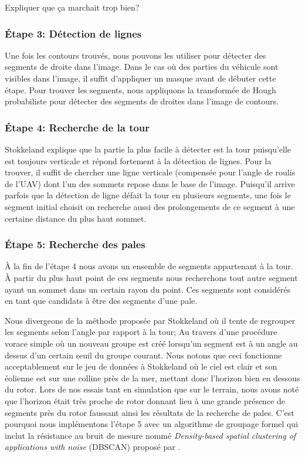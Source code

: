 \incomplete  Expliquer que ça marchait trop bien?

\subsubsection{Étape 3: Détection de lignes}

Une fois les contours trouvés, nous pouvons les utiliser pour détecter des segments de droite dans l'image. Dans le cas où des parties du véhicule sont visibles dans l'image, il suffit d'appliquer un masque avant de débuter cette étape. Pour trouver les segments, nous appliquons la transformée de Hough probabiliste pour détecter des segments de droites dans l'image de contours.

\subsubsection{Étape 4: Recherche de la tour}
\label{subsubsec:approach4}

Stokkeland explique que la partie la plus facile à détecter est la tour puisqu'elle est toujours verticale et répond fortement à la détection de lignes. Pour la trouver, il suffit de chercher une ligne verticale (compensée pour l'angle de roulis de l'UAV) dont l'un des sommets repose dans le base de l'image. Puisqu'il arrive parfois que la détection de ligne défait la tour en plusieurs segments, une fois le segment initial choisit on recherche aussi des prolongements de ce segment à une certaine distance du plus haut sommet.

\subsubsection{Étape 5: Recherche des pales}

À la fin de l'étape 4 nous avons un ensemble de segments appartenant à la tour. À partir du plus haut point de ces segments nous recherchons tout autre segment ayant un sommet dans un certain rayon du point. Ces segments sont considérés en tant que candidats à être des segments d'une pale.

Nous divergeons de la méthode proposée par Stokkeland où il tente de regrouper les segments selon l'angle par rapport à la tour; Au travers d'une procédure vorace simple où un nouveau groupe est créé lorsqu'un segment est à un angle au dessus d'un certain seuil du groupe courant. Nous notons que ceci fonctionne acceptablement sur le jeu de données à Stokkeland où le ciel est clair et son éolienne est sur une colline près de la mer, mettant donc l'horizon bien en dessous du rotor. Lors de nos essais tant en simulation que sur le terrain, nous avons noté que l'horizon était très proche de rotor donnant lieu à une grande présence de segments près du rotor faussant ainsi les résultats de la recherche de pales. C'est pourquoi nous implémentons l'étape 5 avec un algorithme de groupage formel qui inclut la résistance au bruit de mesure nommé \textit{Density-based spatial clustering of applications with noise} (DBSCAN) proposé par \citep{Ester1996}.

